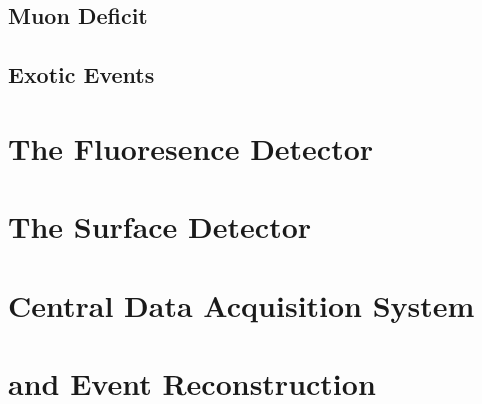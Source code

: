 \subsection{Muon Deficit}
\subsection{Exotic Events}

\section{The Fluoresence Detector}
\label{sec:fd}



\section{The Surface Detector}
\label{sec:sd}



\section{Central Data Acquisition System}
\label{sec:cdas}



\section{\Offline and Event Reconstruction}
\label{sec:rec}


